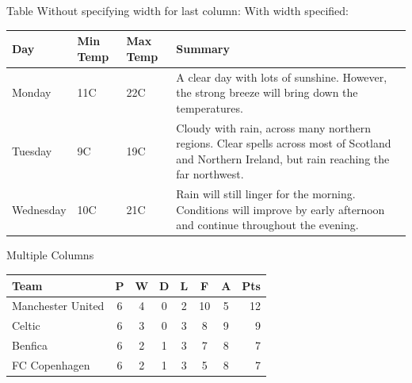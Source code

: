\documentclass[10pt,times]{beamer}
\begin{document}
\begin{frame}{Table}
Without specifying width for last column:
With width specified:
\begin{center}
    \begin{tabular}{ | l | l | l | p{5cm} |}
    \hline
    Day & Min Temp & Max Temp & Summary \\ \hline
    Monday & 11C & 22C & A clear day with lots of sunshine.  
    However, the strong breeze will bring down the temperatures. \\ \hline
    Tuesday & 9C & 19C & Cloudy with rain, across many northern regions. Clear spells
    across most of Scotland and Northern Ireland,
    but rain reaching the far northwest. \\ \hline
    Wednesday & 10C & 21C & Rain will still linger for the morning.
    Conditions will improve by early afternoon and continue
    throughout the evening. \\
    \hline
    \end{tabular}
\end{center}
\end{frame}

\begin{frame}{Multiple Columns}
\begin{center}
\begin{tabular}{l*{6}{c}r}
Team              & P & W & D & L & F  & A & Pts \\
\hline
Manchester United & 6 & 4 & 0 & 2 & 10 & 5 & 12  \\
Celtic            & 6 & 3 & 0 & 3 &  8 & 9 &  9  \\
Benfica           & 6 & 2 & 1 & 3 &  7 & 8 &  7  \\
FC Copenhagen     & 6 & 2 & 1 & 3 &  5 & 8 &  7  \\
\end{tabular}
\end{center}
\end{frame}
\end{document}
